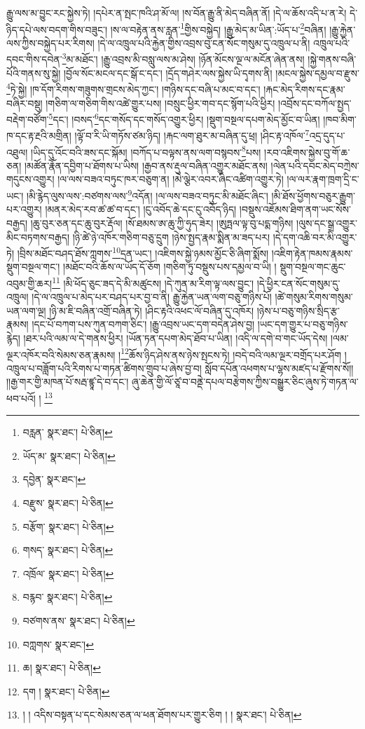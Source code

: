 རྒྱུ་ལས་མ་བྱུང་རང་སྐྱེས་ཏེ། །དཔེར་ན་སྤང་ཁའི་ཤ་མོ་ལ། །ས་བོན་རྒྱུ་ནི་མེད་བཞིན་ནོ། །དེ་ལ་ཆོས་འདི་པ་ན་རེ། དེ་ཉིད་དཔེ་ལས་བདག་གིས་བཟུང་། །ས་ལ་བརྟེན་ནས་རླན་\footnote{བརླན་  སྣར་ཐང་།  པེ་ཅིན། }གྱིས་བསྐྱེད། །རྒྱུ་མེད་མ་ཡིན་:ཡོད་པ་\footnote{ཡོད་མ་  སྣར་ཐང་།  པེ་ཅིན། }བཞིན། །རྒྱུ་རྐྱེན་ལས་ཀྱིས་བསྐྱེད་པར་རིགས། །དེ་ལ་འཁྲུལ་པའི་རྐྱེན་གྱིས་འབྲས་བུ་ངན་སོང་གསུམ་དུ་འཁྲུལ་པ་ནི། འཁྲུལ་པའི་དབང་གིས་དབེན་\footnote{དབྱེན་  སྣར་ཐང་། }མ་མཐོང་། །རྒྱུ་འབྲས་མི་བསླུ་ལས་མ་ཤེས། །ཉོན་མོངས་ལྔ་ལ་མངོན་ཞེན་ནས། །སྐྱེ་གནས་བཞི་པོའི་གནས་སུ་སྐྱེ། །བྱོལ་སོང་མངལ་དང་སྒོ་ང་དང་། །དྲོད་གཤེར་ལས་སྐྱེས་ཡི་དྭགས་ནི། །མངལ་སྐྱེས་དམྱལ་བ་རྫུས་\footnote{བརྫུས་  སྣར་ཐང་།  པེ་ཅིན། }ཏེ་སྐྱེ། །ཁ་དོག་རིགས་གཟུགས་གྲངས་མེད་ཀྱང་། །གཉིས་དང་བཞི་པ་མང་བ་དང་། །རྐང་མེད་རིགས་དང་རྣམ་བཞིར་བསྡུ། །གཅིག་ལ་གཅིག་གིས་འཚེ་གྱུར་པས། །བསྲུང་ཕྱིར་གབ་དང་སྙོག་པའི་ཕྱིར། །འབྲོས་དང་བཀོལ་སྤྱད་བརྡེག་བཙོག་\footnote{བརྩོག་  སྣར་ཐང་།  པེ་ཅིན། }དང་། །བསད་\footnote{གསད་  སྣར་ཐང་།  པེ་ཅིན། }དང་གསོད་དང་གསོད་འགྱུར་ཕྱིར། །སྡུག་བསྔལ་དཔག་མེད་མྱོང་བ་ཡིན། །ཁབ་མིག་ཁ་དང་རྟ་རྔའི་མགྲིན། །ལྟོ་བ་རི་ཡི་གཏོས་ཙམ་ཉིད། །རྐང་ལག་ཐུར་མ་བཞིན་དུ་ཕྲ། །ཤིང་རྟ་འཁོལ་\footnote{འཁྲོལ་  སྣར་ཐང་།  པེ་ཅིན། }འདྲ་དུད་པ་འཐུལ། །ཡིད་དུ་འོང་བའི་ཟས་དང་སྐོམ། །བཀོད་པ་བལྟས་ནས་ལག་བསྙབས་\footnote{བརྙབ་  སྣར་ཐང་།  པེ་ཅིན། }པས། །རབ་འཇིགས་སྐྱེས་བུ་གོ་ཆ་ཅན། །མཚོན་རྣོན་དབྱིག་པ་ཐོགས་པ་ཡིས། །རྒྱབ་ནས་རྡུལ་བཞིན་འགྱུར་མཐོང་ནས། །ལེན་པའི་དབང་མེད་བཀྲེས་གདུངས་འགྱུར། །ལ་ལས་བཟའ་བཏུང་ཁར་བཅུག་ན། །མེ་ལྕེར་འབར་ཞིང་འཚིག་འགྱུར་ཏེ། །ལ་ལར་རྣག་ཁྲག་དྲི་ང་ཡང་། །མི་རྙེད་ལུས་ལས་:བཙགས་ལས་\footnote{བཙགས་ནས་  སྣར་ཐང་།  པེ་ཅིན། }འདོན། །ལ་ལས་བཟའ་བཏུང་མི་མཐོང་ཞིང་། །མི་ཐོས་ཕྱོགས་བཅུར་རྒྱུག་པར་འགྱུར། །མནར་མེད་རབ་ཚ་ཚ་བ་དང་། །ངུ་འབོད་ཆེ་དང་ངུ་འབོད་ཉིད། །བསྡུས་འཇོམས་ཐིག་ནག་ཡང་སོས་བརྒྱད། །ཆུ་བུར་ཅན་དང་ཆུ་བུར་རྡོལ། །སོ་ཐམས་ཨ་ཆུ་ཀྱི་ཧུད་ཟེར། །ཨུཏྤལ་ལྟ་བུ་པདྨ་གཉིས། །ལུས་དང་སྒྲ་འགྱུར་མིང་བཏགས་བརྒྱད། །ཉི་ཚེ་ཉེ་འཁོར་གཅིག་བཅུ་དྲུག །ཉེས་སྤྱད་རྣམ་སྨིན་མ་ཟད་པར། །དེ་དག་འཆི་བར་མི་འགྱུར་ཏེ། །བྲིས་མཐོང་བཤད་ཐོས་ཀླགས་\footnote{བཀླགས་  སྣར་ཐང་། }དྲན་ཡང་། །འཇིགས་སྐྱེ་ཉམས་མྱོང་ཅི་ཞིག་སྨོས། །འཇིག་རྟེན་ཁམས་རྣམས་སྡུག་བསྔལ་གང་། །མཐོང་བའི་ཆོས་ལ་ཡོད་དོ་ཅོག །གཅིག་ཏུ་བསྡུས་པས་དམྱལ་བ་ཡི། །
སྡུག་བསྔལ་གང་ཆུང་འབུམ་གྱི་ཆར།\footnote{ཆ།  སྣར་ཐང་།  པེ་ཅིན། } །མི་ཕོད་ཅུང་ཟད་དེ་མི་མཚུངས། །དེ་ཀུན་མ་རིག་ལྟ་ལས་བྱུང་། །དེ་ཕྱིར་ངན་སོང་གསུམ་དུ་འཁྲུལ། །དེ་ལ་འཁྲུལ་པ་མེད་པར་བཤད་པར་བྱ་བ་ནི། རྒྱུ་རྐྱེན་ཡན་ལག་བཅུ་གཉིས་པོ། །ཚེ་གསུམ་རིགས་གསུམ་ཡན་ལག་ལྔ། །ཉི་མ་ཇི་བཞིན་འགྲོ་བཞིན་ཏེ། །ཤིང་རྟའི་འཕང་ལོ་བཞིན་དུ་འཁོར། །ཉེས་པ་བཅུ་གཉིས་སྲིད་རྩ་རྣམས། །དང་པོ་བཀག་པས་ཀུན་བཀག་ཅིང་། །རྒྱུ་འབྲས་ཡང་དག་བདེན་ཤེས་བྱ། །ཡང་དག་གྱུར་པ་བཅུ་གཉིས་རྙེད། །ཐར་པའི་ལམ་ལ་དེ་གནས་ཕྱིར། །ཡོན་ཏན་དཔག་མེད་ཐོབ་པ་ཡིན། །འདི་ལ་དགེ་བ་གང་ཡོད་དེས། །ལམ་ལྔར་འཁོར་བའི་སེམས་ཅན་རྣམས། །\footnote{དག །  སྣར་ཐང་།  པེ་ཅིན། }ཆོས་ཉིད་ཤེས་ནས་ཉེས་སྤངས་ཏེ། །བདེ་བའི་ལམ་ལྔར་བགྲོད་པར་ཤོག །འཁྲུལ་པ་བཟློག་པའི་རིགས་པ་གཏན་ཚིགས་གྲུབ་པ་ཞེས་བྱ་བ། སློབ་དཔོན་འཕགས་པ་ལྷས་མཛད་པ་རྫོགས་སོ།། །།རྒྱ་གར་གྱི་མཁན་པོ་སརྦ་ཛྙཱ་དེ་བ་དང་། ཞུ་ཆེན་གྱི་ལོ་ཙཱ་བ་བནྡེ་དཔལ་བརྩེགས་ཀྱིས་བསྒྱུར་ཅིང་ཞུས་ཏེ་གཏན་ལ་ཕབ་པའོ། ། \footnote{། ། འདིས་བསྟན་པ་དང་སེམས་ཅན་ལ་ཕན་ཐོགས་པར་གྱུར་ཅིག ། །  སྣར་ཐང་།  པེ་ཅིན། }